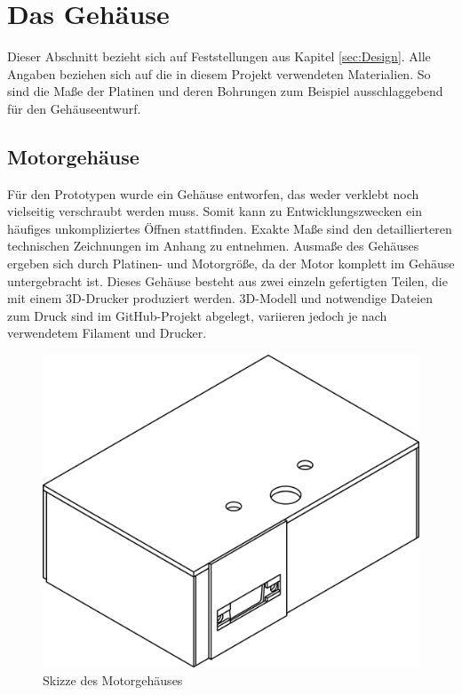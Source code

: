 \documentclass[11pt, titlepage]{report}
\begin{document}
		\section{Das Gehäuse}
		\label{sec:Casing}
			Dieser Abschnitt bezieht sich auf Feststellungen aus Kapitel \ref{sec:Design}. Alle Angaben beziehen sich auf die in diesem Projekt verwendeten Materialien. So sind die Maße der Platinen und deren Bohrungen zum Beispiel ausschlaggebend für den Gehäuseentwurf. 
			\subsection{Motorgehäuse}
				Für den Prototypen wurde ein Gehäuse entworfen, das weder verklebt noch vielseitig verschraubt werden muss. Somit kann zu Entwicklungszwecken ein häufiges unkompliziertes Öffnen stattfinden. Exakte Maße sind den detaillierteren technischen Zeichnungen im Anhang zu entnehmen. Ausmaße des Gehäuses ergeben sich durch Platinen- und Motorgröße, da der Motor  komplett im Gehäuse untergebracht ist. Dieses Gehäuse besteht aus zwei einzeln gefertigten Teilen, die mit einem 3D-Drucker produziert werden. 3D-Modell und notwendige Dateien zum Druck sind im GitHub-Projekt abgelegt, variieren jedoch je nach verwendetem Filament und Drucker.
				\vspace{3em}
				\begin{figure}[htbp]
					\centering
					\includegraphics[width=0.75\linewidth]{./img/Motor_Case_Draw.png}
					\caption{Skizze des Motorgehäuses
					\label{fig:imgMotorDraw}}			
				\end{figure}
			\newpage
\end{document}
